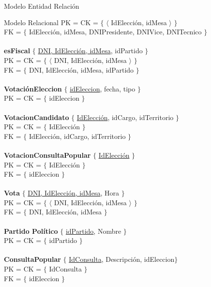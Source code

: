 \begin{section}{Modelo Entidad Relaci\'on}
\begin{subsection}{Modelo Relacional}
PK = CK = $ \lbrace $ $ \langle $ IdElecci\'on, idMesa $ \rangle $ $ \rbrace $ \\
FK = $ \lbrace $ IdElecci\'on, idMesa, DNIPresidente, DNIVice, DNITecnico $ \rbrace $\\
\\
\textbf{esFiscal} $ \lbrace $ \underline{DNI, IdElecci\'on, idMesa}, idPartido $ \rbrace $ \\
PK = CK = $ \lbrace $ $ \langle $ DNI, IdElecci\'on, idMesa $ \rangle $ $ \rbrace $ \\
FK = $ \lbrace $ DNI, IdElecci\'on, idMesa, idPartido $ \rbrace $\\
\\
\textbf{Votaci\'onEleccion} $ \lbrace $ \underline{idEleccion}, fecha, tipo $ \rbrace $ \\
PK = CK = $ \lbrace $ idEleccion $ \rbrace $ \\
\\
\textbf{VotacionCandidato} $ \lbrace $ \underline{IdElecci\'on}, idCargo, idTerritorio $ \rbrace $ \\
PK = CK = $ \lbrace $ IdElecci\'on $ \rbrace $ \\
FK = $ \lbrace $ IdElecci\'on, idCargo, idTerritorio $ \rbrace $\\
\\
\textbf{VotacionConsultaPopular} $ \lbrace $ \underline{IdElecci\'on} $ \rbrace $ \\
PK = CK = $ \lbrace $ IdElecci\'on $ \rbrace $ \\
FK = $ \lbrace $ idEleccion $ \rbrace $\\
\\
\textbf{Vota} $ \lbrace $ \underline{DNI, IdElecci\'on, idMesa}, Hora $ \rbrace $ \\
PK = CK = $ \lbrace $ $ \langle $ DNI, IdElecci\'on, idMesa $ \rangle $ $ \rbrace $ \\
FK = $ \lbrace $ DNI, IdElecci\'on, idMesa $ \rbrace $\\
\\
\textbf{Partido Pol\'itico} $\lbrace$ \underline{idPartido}, Nombre $\rbrace$ \\
PK = CK = $ \lbrace $ idPartido $ \rbrace $ \\
\\
\textbf{ConsultaPopular} $ \lbrace $ \underline{IdConsulta}, Descripci\'on, idEleccion$ \rbrace $ \\
PK = CK = $ \lbrace $ IdConsulta $ \rbrace $ \\
FK = $ \lbrace $ idEleccion $ \rbrace $\\

\end{subsection}
\end{section}
